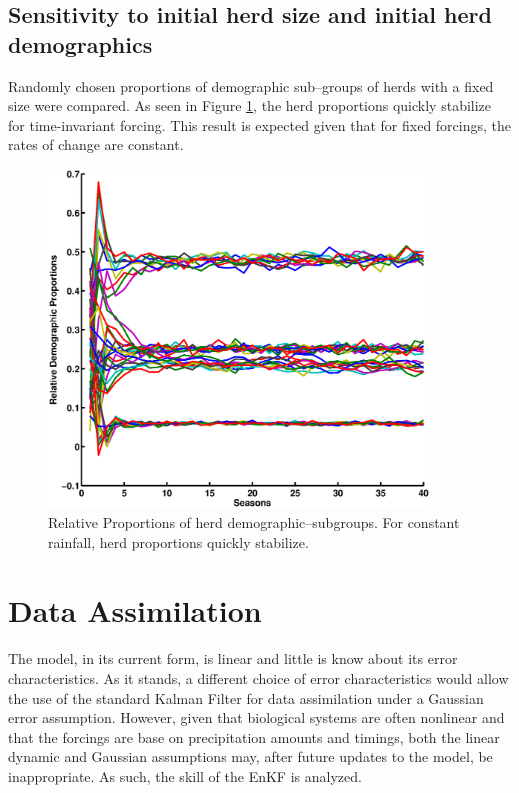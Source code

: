 \documentclass[fleqn, letterpaper]{article}
\numberwithin{figure}{section}
\begin{document}
\subsection{Sensitivity to initial herd size and initial herd demographics}
Randomly chosen proportions of demographic sub--groups of herds with a fixed size were compared. As seen in Figure \ref{relprop}, the herd proportions quickly stabilize for time-invariant forcing. This result is expected given that for fixed forcings, the rates of change are constant.
\begin{figure}
\includegraphics[width=0.9\textwidth]{relprop}
\caption{Relative Proportions of herd demographic--subgroups. For constant rainfall, herd proportions quickly stabilize.}
\label{relprop}
\end{figure}

\section{Data Assimilation}
The model, in its current form, is linear and little is know about its error characteristics.
As it stands, a different choice of error characteristics would allow the use of the  standard Kalman Filter for data assimilation under a Gaussian error assumption.
However, given that biological systems are often nonlinear and that the forcings are base on precipitation amounts and timings, both the linear dynamic and Gaussian assumptions may, after future updates to the model, be inappropriate.  As such, the skill of the EnKF is analyzed. 
\end{document}
